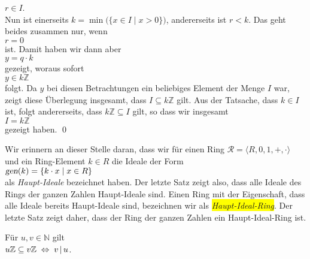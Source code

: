\begin{enumerate}
      $r \in I$.
      \\[0.2cm]
      Nun ist einerseits $k = \min\bigl(\{x \in I \mid x > 0 \}\bigr)$, andererseits ist $r < k$.
      Das geht beides zusammen nur, wenn
      \\[0.2cm]
      \hspace*{1.3cm}
      $r = 0$
      \\[0.2cm]
      ist.  Damit haben wir dann aber
      \\[0.2cm]
      \hspace*{1.3cm}
      $y = q \cdot k$
      \\[0.2cm]
      gezeigt, woraus sofort
      \\[0.2cm]
      \hspace*{1.3cm}
      $y \in k\mathbb{Z}$
      \\[0.2cm]
      folgt.  Da $y$ bei diesen Betrachtungen ein beliebiges Element der Menge $I$ war,
      zeigt diese \"{U}berlegung insgesamt, dass $I \subseteq k\mathbb{Z}$ gilt.  Aus der
      Tatsache, dass $k \in I$ ist, folgt andererseits, dass $k\mathbb{Z} \subseteq I$
      gilt, so dass wir insgesamt
      \\[0.2cm]
      \hspace*{1.3cm}
      $I = k\mathbb{Z}$
      \\[0.2cm]
      gezeigt haben.  \qed
\end{enumerate}

\remark
Wir erinnern an dieser Stelle daran, dass wir f\"{u}r einen Ring 
$\mathcal{R} = \langle R, 0, 1, +, \cdot \rangle$ und ein
Ring-Element $k \in R$ die Ideale der Form
\\[0.2cm]
\hspace*{1.3cm}
$\textsl{gen}(k) = \{ k \cdot x \mid x \in R \}$
\\[0.2cm]
als \emph{Haupt-Ideale} bezeichnet haben.  Der letzte Satz zeigt also, dass alle Ideale des Rings
der ganzen Zahlen Haupt-Ideale sind.  Einen Ring mit der Eigenschaft, dass alle Ideale
bereits Haupt-Ideale sind, bezeichnen wir als \colorbox{yellow}{\emph{Haupt-Ideal-Ring}}.  Der letzte Satz
zeigt daher, dass der Ring der ganzen Zahlen ein Haupt-Ideal-Ring ist. \eoxs

\begin{Lemma}
  F\"{u}r $u,v \in \mathbb{N}$ gilt
  \\[0.2cm]
  \hspace*{1.3cm}
  $u\mathbb{Z} \subseteq v\mathbb{Z} \;\Leftrightarrow\; v \,|\, u$.
\end{Lemma}


